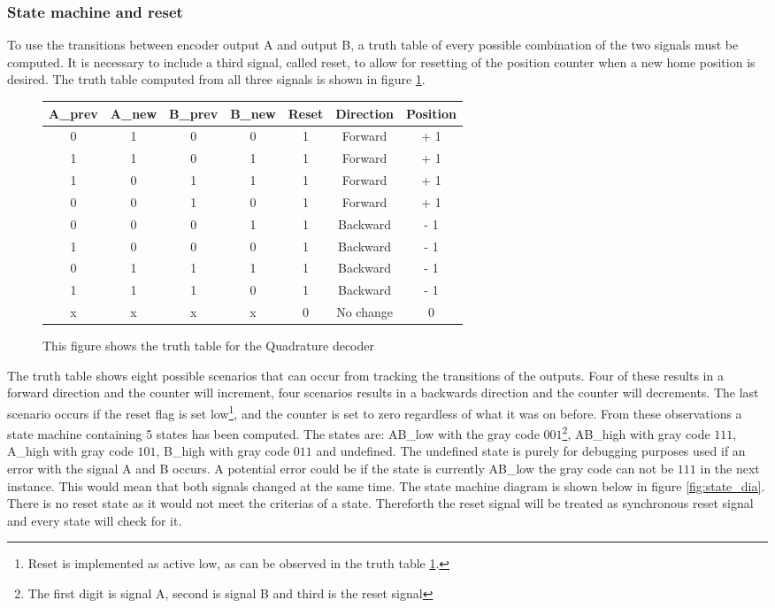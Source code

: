 \documentclass[../../../main]{subfiles}
\begin{document}
\subsubsection{State machine and reset}
To use the transitions between encoder output A and output B, a truth table of every possible combination of the two signals must be computed. It is necessary to include a third signal, called reset, to allow for resetting of the position counter when a new home position is desired. The truth table computed from all three signals is shown in figure \ref{fig:truth_table}.
\begin{figure}[H]
  \begin{tabular}{|c | c | c | c | c | c |c|}
  \hline
   A\_prev & A\_new & B\_prev & B\_new & Reset & Direction & Position \\
   \hline
   0 & 1 & 0 & 0 & 1 & Forward & + 1 \\
   1 & 1 & 0 & 1 & 1 & Forward & + 1 \\
   1 & 0 & 1 & 1 & 1 & Forward & + 1 \\
   0 & 0 & 1 & 0 & 1 & Forward & + 1 \\
   0 & 0 & 0 & 1 & 1 & Backward & - 1 \\
   1 & 0 & 0 & 0 & 1 & Backward & - 1 \\
   0 & 1 & 1 & 1 & 1 & Backward & - 1 \\
   1 & 1 & 1 & 0 & 1 & Backward & - 1 \\
   x & x & x & x & 0 & No change &  0 \\
   \hline
  \end{tabular}
  \caption{This figure shows the truth table for the Quadrature decoder}
  \label{fig:truth_table}
\end{figure}
The truth table shows eight possible scenarios that can occur from tracking the transitions of the outputs. Four of these results in a forward direction and the counter will increment, four scenarios results in a backwards direction and the counter will decrements. The last scenario occurs if the reset flag is set low\footnote{Reset is implemented as active low, as can be observed in the truth table \ref{fig:truth_table}.}, and the counter is set to zero regardless of what it was on before. From these observations a state machine containing 5 states has been computed. The states are: AB\_low with the gray code $001$\footnote{The first digit is signal A, second is signal B and third is the reset signal}, AB\_high with gray code $111$, A\_high with gray code $101$, B\_high with gray code $011$ and undefined. The undefined state is purely for debugging purposes used if an error with the signal A and B occurs. A potential error could be if the state is currently AB\_low the gray code can not be $111$ in the next instance. This would mean that both signals changed at the same time. The state machine diagram is shown below in figure \ref{fig:state_dia}. There is no reset state as it would not meet the criterias of a state. Thereforth the reset signal will be treated as synchronous reset signal and every state will check for it. \\
\end{document}
